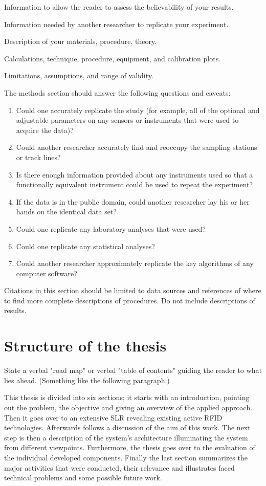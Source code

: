 \begin{tight_itemize}
  \item Information to allow the reader to assess the believability of your results.
  \item Information needed by another researcher to replicate your experiment.
  \item Description of your materials, procedure, theory.
  \item Calculations, technique, procedure, equipment, and calibration plots. 
  \item Limitations, assumptions, and range of validity. 
\end{tight_itemize}

The methods section should answer the following questions and caveats: 

\begin{enumerate}
  \item Could one accurately replicate the study (for example, all of the optional and adjustable parameters on any sensors or instruments that were used to acquire the data)? 
  \item Could another researcher accurately find and reoccupy the sampling stations or track lines?
  \item Is there enough information provided about any instruments used so that a functionally equivalent instrument could be used to repeat the experiment?
  \item If the data is in the public domain, could another researcher lay his or her hands on the identical data set?
  \item Could one replicate any laboratory analyses that were used?
  \item Could one replicate any statistical analyses?
  \item Could another researcher approximately replicate the key algorithms of any computer software?
\end{enumerate}

Citations in this section should be limited to data sources and references of
where to find more complete descriptions of procedures. Do not include
descriptions of results.

\section{Structure of the thesis}
\label{sec:StructureOfTheThesis}

State a verbal "road map" or verbal "table of contents" guiding the reader to
what lies ahead. (Something like the following paragraph.)

This thesis is divided into six sections; it starts with an introduction,
pointing out the problem, the objective and giving an overview of the applied
approach. Then it goes over to an extensive SLR revealing existing active RFID
technologies. Afterwards follows a discussion of the aim of this work. The next
step is then a description of the system's architecture illuminating the system
from different viewpoints. Furthermore, the thesis goes over to the evaluation
of the individual developed components. Finally the last section summarizes the
major activities that were conducted, their relevance and illustrates faced
technical problems and some possible future work.